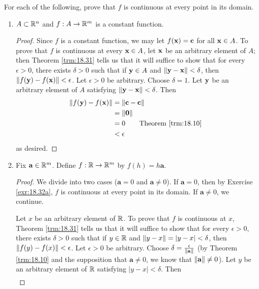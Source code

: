 \documentclass[../main.tex]{subfiles}
\begin{document}
\begin{exercise}\label{exr:18.32}
    For each of the following, prove that $f$ is continuous at every point in its domain.
    \begin{enumerate}[label={(\alph*)},ref={\theexercise\alph*}]
        \item \label{exr:18.32a}$A\subset\mathbb{R}^n$ and $f:A\to\mathbb{R}^m$ is a constant function.
        \begin{proof}
            Since $f$ is a constant function, we may let $f(\mathbf{x})=\mathbf{c}$ for all $\mathbf{x}\in A$. To prove that $f$ is continuous at every $\mathbf{x}\in A$, let $\mathbf{x}$ be an arbitrary element of $A$; then Theorem \ref{trm:18.31} tells us that it will suffice to show that for every $\epsilon>0$, there exists $\delta>0$ such that if $\mathbf{y}\in A$ and $\norm{\mathbf{y}-\mathbf{x}}<\delta$, then $\norm{f(\mathbf{y})-f(\mathbf{x})}<\epsilon$. Let $\epsilon>0$ be arbitrary. Choose $\delta=1$. Let $\mathbf{y}$ be an arbitrary element of $A$ satisfying $\norm{\mathbf{y}-\mathbf{x}}<\delta$. Then
            \begin{align*}
                \norm{f(\y)-f(\x)} &= \norm{\mathbf{c}-\mathbf{c}}\\
                &= \norm{\mathbf{0}}\\
                &= 0\tag*{Theorem \ref{trm:18.10}}\\
                &< \epsilon
            \end{align*}
            as desired.
        \end{proof}
        \item \label{exr:18.32b}Fix $\mathbf{a}\in\mathbb{R}^m$. Define $f:\mathbb{R}\to\mathbb{R}^m$ by $f(h)=h\mathbf{a}$.
        \begin{proof}
            We divide into two cases ($\mathbf{a}=0$ and $\mathbf{a}\neq 0$). If $\mathbf{a}=0$, then by Exercise \ref{exr:18.32a}, $f$ is continuous at every point in its domain. If $\mathbf{a}\neq 0$, we continue.\par
            Let $x$ be an arbitrary element of $\mathbb{R}$. To prove that $f$ is continuous at $x$, Theorem \ref{trm:18.31} tells us that it will suffice to show that for every $\epsilon>0$, there exists $\delta>0$ such that if $y\in\mathbb{R}$ and $\norm{y-x}=|y-x|<\delta$, then $\norm{f(y)-f(x)}<\epsilon$. Let $\epsilon>0$ be arbitrary. Choose $\delta=\frac{\epsilon}{\norm{\mathbf{a}}}$ (by Theorem \ref{trm:18.10} and the supposition that $\mathbf{a}\neq 0$, we know that $\norm{\mathbf{a}}\neq 0$). Let $y$ be an arbitrary element of $\mathbb{R}$ satisfying $|y-x|<\delta$. Then
            \begin{align*}

\end{align*}
\end{proof}
\end{enumerate}
\end{exercise}
\end{document}
